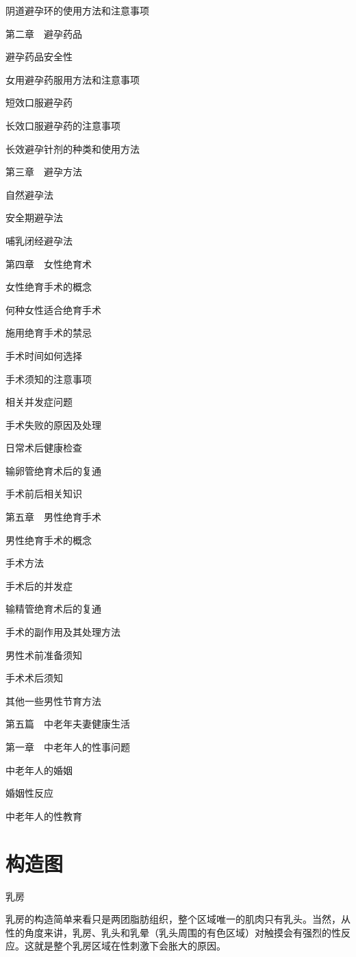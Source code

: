 \documentclass[12pt,UTF8]{ctexbook}
\begin{document}
阴道避孕环的使用方法和注意事项

第二章　避孕药品

避孕药品安全性

女用避孕药服用方法和注意事项

短效口服避孕药

长效口服避孕药的注意事项

长效避孕针剂的种类和使用方法

第三章　避孕方法

自然避孕法

安全期避孕法

哺乳闭经避孕法

第四章　女性绝育术

女性绝育手术的概念

何种女性适合绝育手术

施用绝育手术的禁忌

手术时间如何选择

手术须知的注意事项

相关并发症问题

手术失败的原因及处理

日常术后健康检查

输卵管绝育术后的复通

手术前后相关知识

第五章　男性绝育手术

男性绝育手术的概念

手术方法

手术后的并发症

输精管绝育术后的复通

手术的副作用及其处理方法

男性术前准备须知

手术术后须知

其他一些男性节育方法

第五篇　中老年夫妻健康生活

第一章　中老年人的性事问题

中老年人的婚姻

婚姻性反应

中老年人的性教育


\chapter{构造图}

乳房

乳房的构造简单来看只是两团脂肪组织，整个区域唯一的肌肉只有乳头。当然，从性的角度来讲，乳房、乳头和乳晕（乳头周围的有色区域）对触摸会有强烈的性反应。这就是整个乳房区域在性刺激下会胀大的原因。
\end{document}

